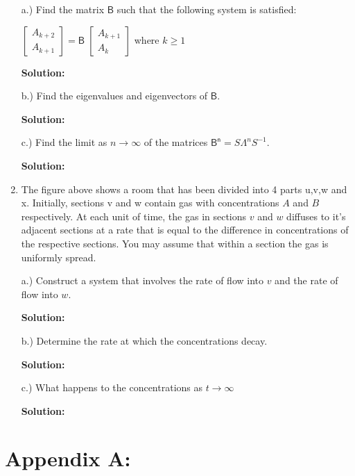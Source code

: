 \documentclass[a4paper, 11pt]{article}
\newcommand{\mat}[1]{\boldsymbol { \mathsf{#1}} }
\begin{document}
\begin{enumerate}

a.) Find the matrix $\mat{B}$ such that the following system is satisfied:

$
\begin{bmatrix}
A_{k+2}\\
A_{k+1}
\end{bmatrix} = \mat{B} \;
\begin{bmatrix}
A_{k+1}\\
A_{k}
\end{bmatrix}
$
where $k \geq 1$ 
\newline

\textbf{Solution:}

b.) Find the eigenvalues and eigenvectors of $\mat{B}$.

\textbf{Solution:}

c.) Find the limit as $n \rightarrow \infty$ of the matrices $\mat{B^n} = S \Lambda ^{n}S^{-1}$.

\textbf{Solution:}

\item

The figure above shows a room that has been divided into 4 parts u,v,w and x. Initially, sections v and w contain gas with concentrations $A$ and $B$ respectively. At each unit of time, the gas in sections $v$ and $w$ diffuses to it's adjacent sections at a rate that is equal to the difference in concentrations of the respective sections. You may assume that within a section the gas is uniformly spread.

a.) Construct a system that involves the rate of flow into $v$ and the rate of flow into $w$.

\textbf{Solution:}

b.) Determine the rate at which the concentrations decay.

\textbf{Solution:}

c.) What happens to the concentrations as $t \rightarrow \infty$

\textbf{Solution:}

\end{enumerate}

\newpage

\section*{Appendix A:}

\newpage

\begin{thebibliography}{}
\end{thebibliography}
\end{document}
